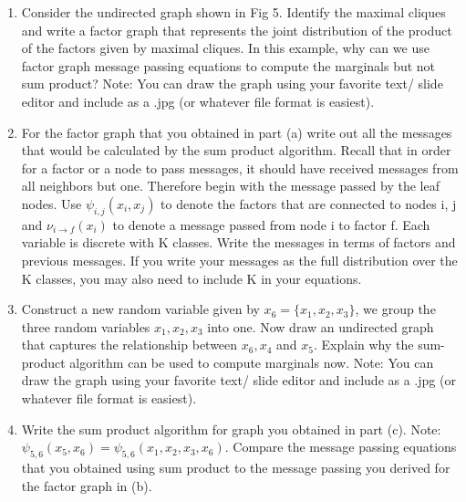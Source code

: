 \documentclass[11pt]{article}
\begin{document}
\begin{enumerate}[{(a)}]
    \item Consider the undirected graph shown in Fig 5. Identify the maximal cliques and write a factor graph that represents the joint distribution of the product of the factors given by maximal cliques. In this example, why can we use factor graph message passing equations to compute the marginals but not sum product? Note: You can draw the graph using your favorite text/ slide editor and include as a .jpg (or whatever file format is easiest).
    \newline
\begin{answertext}{4cm}{}
    
\end{answertext}
\begin{answertext}{6cm}{}
    
\end{answertext}
\item For the factor graph that you obtained in part (a) write out all the messages that would be calculated by the sum product algorithm. Recall that in order for a factor or a node to pass messages, it should have received messages from all neighbors but one. Therefore begin with the message passed by the leaf nodes. Use $\psi_{i,j}(x_i, x_j)$ to denote the factors that are connected to nodes i, j and $\nu_{i \rightarrow f}(x_i)$ to denote a message passed from node i to factor f. Each variable is discrete with K classes. Write the messages in terms of factors and previous messages. If you write your messages as the full distribution over the K classes, you may also need to include K in your equations. 
\newline
\begin{answertext}{12.0cm}{}
    
\end{answertext}
\item Construct a new random variable given by $x_6 = \{x_1, x_2, x_3\}$, we group the three random variables $x_1, x_2, x_3$ into one. Now draw an undirected graph that captures the relationship between $x_6, x_4$ and $x_5$. Explain why the sum-product algorithm can be used to compute marginals now. Note: You can draw the graph using your favorite text/ slide editor and include as a .jpg (or whatever file format is easiest).
\newline
\begin{answertext}{8.5cm}{}
    
\end{answertext}
\item Write the sum product algorithm for graph you obtained in part (c). Note: $\psi_{5, 6}(x_5, x_6) = \psi_{5,6}(x_1, x_2, x_3, x_6)$. Compare the message passing equations that you obtained using sum product to the message passing you derived for the factor graph in (b). 
\newline
\begin{answertext}{9.5cm}{}
    

\end{answertext}
\end{enumerate}
\end{document}
